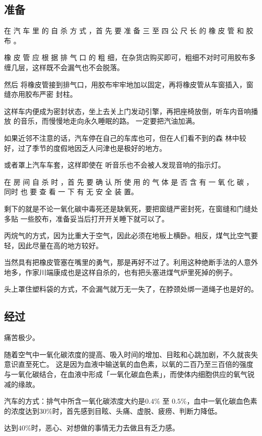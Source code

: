 \documentclass[UTF8]{ctexart}
\begin{document}
\subsection{准备}

在 汽 车 里 的 自 杀 方 式 ，首 先 要 准 备 三 至 四 公 尺 长 的 橡 皮 管 和 胶 布 。

橡 皮 管 应 根 据 排 气 口 的 粗 细，在杂货店购买即可，粗细不对时可用胶布多缠几层，这样既不会漏气也不会脱落。

然后 将橡皮管接到排气口，用胶布牢牢地加以固定，再将橡皮管从车窗插入，窗缝亦用胶布严密 封柱。

这样车内便成为密封状态，坐上去关上门发动引擎，再把座椅放倒，听车内音响播放 的音乐，而慢慢地走向永久睡眠的路。 一定要把汽油加满。

如果近邻不注意的话，汽车停在自己的车库也可，但在人们看不到的森 林中较好，过了季节的度假地因乏人问津也是极好的地方。

或者罩上汽车车套，这样即使在 听音乐也不会被人发现音响的指示灯。

在 房 间 自 杀 时 ，首 先 要 确 认 所 使 用 的 气 体 是 否 含 有 一 氧 化 碳 ，同时 也 要 查 看 一 下 有 无 安 全 装 置。

剩下的就是不论一氧化碳中毒死还是缺氧死，要把窗缝严密封死，在窗缝和门缝处多贴 一些胶布，准备妥当后打开开关睡下就可以了。

丙烷气的方式，因为比重大于空气，因此必须在地板上横卧。相反，煤气比空气要轻，因此尽量在高的地方较好。

当然具有把橡皮管塞在嘴里的勇气，那是再好不过了。利用这种绝断手法的人意外地多，作家川端康成也是这样自杀的，也有把头塞进煤气炉里死掉的例子。

头上罩住塑料袋的方式，不会漏气就万无一失了，在脖颈处绑一道绳子也是好的。

\subsection{经过}

痛苦极少。

随着空气中一氧化碳浓度的提高、吸入时间的增加、目眩和心跳加剧，不久就丧失意识直至死亡。
这是因为血液中输送氧的血色素，以氧的二百乃至三百倍的强度与一氧化碳结合，在血液中形成「一氧化碳血色素」，而使体内细胞供应的氧气锐减的缘故。

汽车的方式：排气中所含一氧化碳浓度大约是$0.4\%$ 至 $0.5\%$，血中一氧化碳血色素的浓度达到$30\%$时，首先感到目眩、头痛、虚脱、疲痨、判断力降低。

达到$40\%$时，恶心、对想做的事情无力去做且有乏力感。
\end{document}
